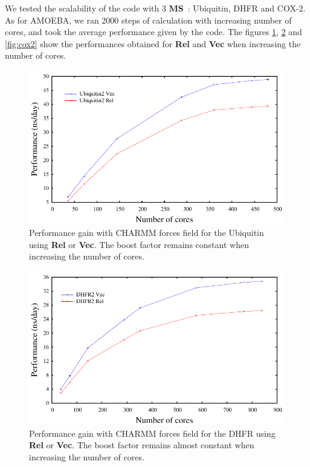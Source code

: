 \documentclass[9pt,comparison]{livecoms}
\begin{document}
\hspace{\parindent} We tested the scalability of the code with 3 \textbf{MS}~: Ubiquitin, DHFR and COX-2. As for AMOEBA, we ran 2000 steps of calculation with increasing number of cores, and took the average performance given by the code. The figures \ref{fig:ubiquitin}, \ref{fig:dhfr} and \ref{fig:cox2} show the performances obtained for \textbf{Rel} and \textbf{Vec} when increasing the number of cores.
\begin{figure}[htb!]
\centering
\includegraphics[scale=0.7]{ubiquitin2.pdf}
\caption{Performance gain with CHARMM forces field for the Ubiquitin using \textbf{Rel} or \textbf{Vec}. The boost factor remains constant when increasing the number of cores.}
\label{fig:ubiquitin}
\end{figure}
\begin{figure}[htb!]
\centering
\includegraphics[scale=0.7]{dhfr2.pdf}
\caption{Performance gain with CHARMM forces field for the DHFR using \textbf{Rel} or \textbf{Vec}. The boost factor remains almost constant when increasing the number of cores.}
\label{fig:dhfr}
\end{figure}
\end{document}
